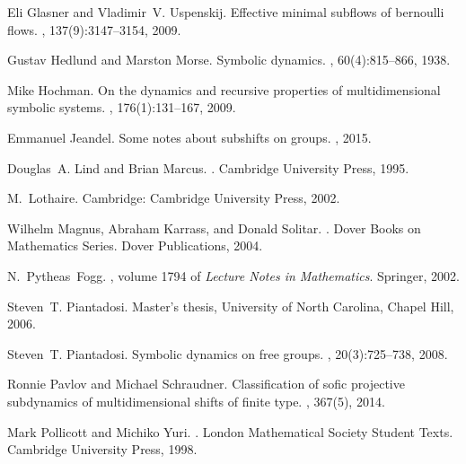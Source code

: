 \documentclass[letterpaper]{amsart}
\theoremstyle{plain}
\begin{document}
\begin{thebibliography}{10}
		Eli Glasner and Vladimir~V. Uspenskij.
		\newblock Effective minimal subflows of bernoulli flows.
		, 137(9):3147--3154, 2009.
		
		Gustav Hedlund and Marston Morse.
		\newblock Symbolic dynamics.
		, 60(4):815--866, 1938.
		
		Mike Hochman.
		\newblock On the dynamics and recursive properties of multidimensional symbolic
		systems.
		, 176(1):131--167, 2009.
		
		Emmanuel Jeandel.
		\newblock Some notes about subshifts on groups.
		, 2015.
		
		Douglas~A. Lind and Brian Marcus.
		.
		\newblock Cambridge University Press, 1995.
		
		M.~{Lothaire}.
		\newblock Cambridge: Cambridge University Press, 2002.
		
		Wilhelm Magnus, Abraham Karrass, and Donald Solitar.
		.
		\newblock Dover Books on Mathematics Series. Dover Publications, 2004.
		
		N.~Pytheas~Fogg.
		,
		volume 1794 of {\em Lecture Notes in Mathematics}.
		\newblock Springer, 2002.
		
		Steven~T. Piantadosi.
		\newblock Master's thesis, {University of North Carolina, Chapel Hill}, 2006.
		
		Steven~T. Piantadosi.
		\newblock Symbolic dynamics on free groups.
		, 20(3):725--738,
		2008.
		
		Ronnie Pavlov and Michael Schraudner.
		\newblock Classification of sofic projective subdynamics of multidimensional
		shifts of finite type.
		, 367(5),
		2014.
		
		Mark Pollicott and Michiko Yuri.
		.
		\newblock London Mathematical Society Student Texts. Cambridge University
		Press, 1998.
		
	\end{thebibliography}
	
	
	
\end{document}
